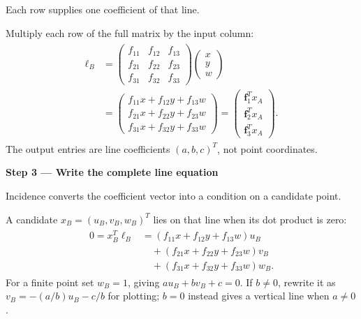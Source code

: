 \documentclass[letterpaper,11pt,english,openany,oneside]{jupyterBook}
\begin{document}
\sphinxAtStartPar
{} Each row supplies one coefficient of that line.

\sphinxAtStartPar
Multiply each row of the full matrix by the input column:
{\color{QuizMathBlue} \begin{equation*}
\begin{split}
\begin{aligned}
\ell_B&=\begin{pmatrix}f_{11}&f_{12}&f_{13}\\f_{21}&f_{22}&f_{23}\\f_{31}&f_{32}&f_{33}\end{pmatrix}
\begin{pmatrix}x\\y\\w\end{pmatrix}\\
&=\begin{pmatrix}f_{11}x+f_{12}y+f_{13}w\\f_{21}x+f_{22}y+f_{23}w\\f_{31}x+f_{32}y+f_{33}w\end{pmatrix}
=\begin{pmatrix}\mathbf f_1^Tx_A\\\mathbf f_2^Tx_A\\\mathbf f_3^Tx_A\end{pmatrix}.
\end{aligned}
\end{split}
\end{equation*}}
\sphinxAtStartPar
The output entries are line coefficients {\color{QuizMathBlue} \((a,b,c)^T\)}, not point coordinates.

\par

\par\medskip{}
{\color{QuizStepRed}\bfseries Step 3 — Write the complete line equation}\par\smallskip

\sphinxAtStartPar
{} Incidence converts the coefficient vector into a condition on a candidate point.

\sphinxAtStartPar
A candidate {\color{QuizMathBlue} \(x_B=(u_B,v_B,w_B)^T\)} lies on that line when its dot product is zero:
{\color{QuizMathBlue} \begin{equation*}
\begin{split}
\begin{aligned}
0=x_B^T\ell_B
&=(f_{11}x+f_{12}y+f_{13}w)u_B\\
&\quad +(f_{21}x+f_{22}y+f_{23}w)v_B\\
&\quad +(f_{31}x+f_{32}y+f_{33}w)w_B.
\end{aligned}
\end{split}
\end{equation*}}
\sphinxAtStartPar
For a finite point set {\color{QuizMathBlue} \(w_B=1\)}, giving {\color{QuizMathBlue} \(au_B+bv_B+c=0\)}. If {\color{QuizMathBlue} \(b\ne0\)}, rewrite it as {\color{QuizMathBlue} \(v_B=-(a/b)u_B-c/b\)} for plotting; {\color{QuizMathBlue} \(b=0\)} instead gives a vertical line when {\color{QuizMathBlue} \(a\ne0\)}.
\end{document}
